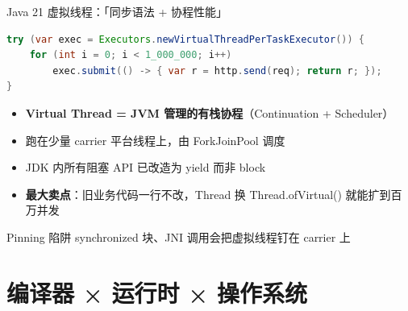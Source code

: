 \documentclass[aspectratio=169, 10pt]{beamer}
\begin{document}
\begin{frame}[fragile]{Java 21 虚拟线程：「同步语法 + 协程性能」}
  \begin{lstlisting}[language=Java, title={百万并发虚拟线程}]
try (var exec = Executors.newVirtualThreadPerTaskExecutor()) {
    for (int i = 0; i < 1_000_000; i++)
        exec.submit(() -> { var r = http.send(req); return r; });
}
  \end{lstlisting}

  \begin{itemize}
    \item \textbf{Virtual Thread = JVM 管理的有栈协程}（Continuation + Scheduler）
    \item 跑在少量 carrier 平台线程上，由 ForkJoinPool 调度
    \item JDK 内所有阻塞 API 已改造为 yield 而非 block
    \item \textbf{最大卖点}：旧业务代码一行不改，Thread 换 Thread.ofVirtual() 就能扩到百万并发
  \end{itemize}

  \begin{alertblock}{Pinning 陷阱}
    synchronized 块、JNI 调用会把虚拟线程钉在 carrier 上
  \end{alertblock}
\end{frame}

\section{编译器 × 运行时 × 操作系统}
\end{document}
